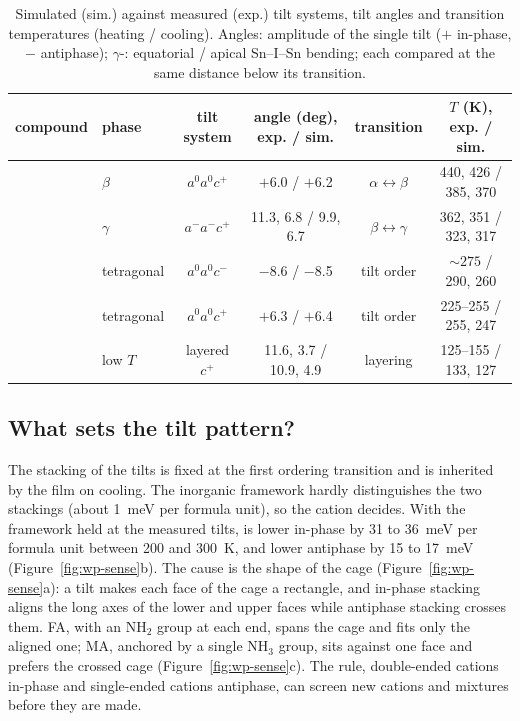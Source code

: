 \begin{table}[t]
  \centering\small
  \caption{Simulated (sim.) against measured (exp.) tilt systems, tilt angles and transition temperatures (heating /
    cooling). Angles: amplitude of the single tilt ($+$ in-phase, $-$ antiphase); $\gamma$-\CsSnI{}: equatorial / apical
    Sn--I--Sn bending; each compared at the same distance below its transition.\cite{Chung2012JACS,
    stoumpos2013semiconducting, Takahashi2011Dalton, Kahmann2020ACSEL, schueller2018crystal}}
  \label{tab:wp-tilts}
  \begin{tabular}{llcccc}
    \toprule
    compound & phase & tilt system & angle (deg), exp. / sim. & transition & $T$ (K), exp. / sim. \\
    \midrule
    \CsSnI{} & $\beta$ & $a^0a^0c^+$ & $+$6.0 / $+$6.2 & $\alpha\leftrightarrow\beta$ & 440, 426 / 385, 370 \\
     & $\gamma$ & $a^-a^-c^+$ & 11.3, 6.8 / 9.9, 6.7 & $\beta\leftrightarrow\gamma$ & 362, 351 / 323, 317 \\
    \MASnI{} & tetragonal & $a^0a^0c^-$ & $-$8.6 / $-$8.5 & tilt order & ${\sim}275$ / 290, 260 \\
    \FASnI{} & tetragonal & $a^0a^0c^+$ & $+$6.3 / $+$6.4 & tilt order & 225--255 / 255, 247 \\
     & low $T$ & layered $c^+$ & 11.6, 3.7 / 10.9, 4.9 & layering & 125--155 / 133, 127 \\
    \bottomrule
  \end{tabular}
\end{table}

\subsection{What sets the tilt pattern?}
\label{sec:wp-sense}
The stacking of the tilts is fixed at the first ordering transition and is inherited by the film on cooling. The
inorganic framework hardly distinguishes the two stackings (about \SI{1}{meV} per formula unit),\cite{Klarbring2019PRB}
so the cation decides. With the framework held at the measured tilts, \FASnI{} is lower in-phase by 31 to \SI{36}{meV}
per formula unit between 200 and \SI{300}{K}, and \MASnI{} lower antiphase by 15 to \SI{17}{meV}
(Figure~\ref{fig:wp-sense}b). The cause is the shape of the cage (Figure~\ref{fig:wp-sense}a): a tilt makes each face
of the cage a rectangle, and in-phase stacking aligns the long axes of the lower and upper faces while antiphase
stacking crosses them. FA, with an NH$_2$ group at each end, spans the cage and fits only the aligned one; MA, anchored
by a single NH$_3$ group, sits against one face and prefers the crossed cage (Figure~\ref{fig:wp-sense}c). The rule,
double-ended cations in-phase and single-ended cations antiphase, can screen new cations and mixtures before they are
made.

